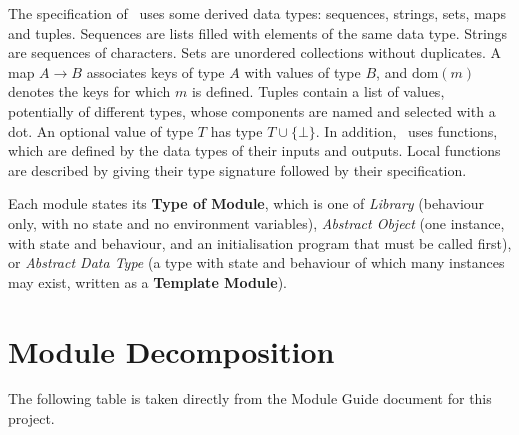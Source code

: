 \documentclass[12pt, titlepage]{article}
\newcommand{\nil}{\bot}
\begin{document}
\noindent
The specification of \progname \ uses some derived data types: sequences,
strings, sets, maps and tuples. Sequences are lists filled with elements of the
same data type. Strings are sequences of characters. Sets are unordered
collections without duplicates. A map $A \to B$ associates keys of type $A$ with
values of type $B$, and $\mathrm{dom}(m)$ denotes the keys for which $m$ is
defined. Tuples contain a list of values, potentially of different types, whose
components are named and selected with a dot. An optional value of type $T$ has
type $T \cup \{\nil\}$. In addition, \progname \ uses functions, which are
defined by the data types of their inputs and outputs. Local functions are
described by giving their type signature followed by their specification.

Each module states its \textbf{Type of Module}, which is one of
\emph{Library} (behaviour only, with no state and no environment variables),
\emph{Abstract Object} (one instance, with state and behaviour, and an
initialisation program that must be called first), or \emph{Abstract Data Type}
(a type with state and behaviour of which many instances may exist, written as a
\textbf{Template Module}).

\section{Module Decomposition}

The following table is taken directly from the Module Guide document for this
project.
\end{document}
